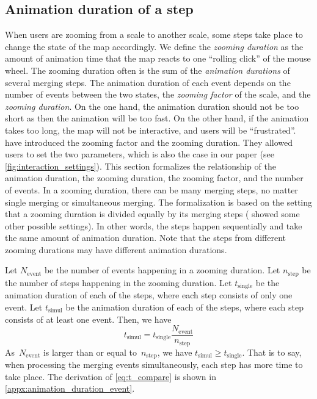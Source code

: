 \documentclass[twocolumn]{svjour3}          %
\begin{document}


\subsection{Animation duration of a step}
\label{sec:zooming_duration}

When users are zooming from a scale to another scale,
some steps take place to change the state of the map accordingly.
We define the \emph{zooming duration} as the amount of 
animation time that the map reacts to one ``rolling click'' of the mouse wheel.
The zooming duration often is the sum of 
the \emph{animation durations} of several merging steps.
The animation duration of each event depends on 
the number of events between the two states,
the \emph{zooming factor} of the scale, and 
the \emph{zooming duration}.
On the one hand, the animation duration should not be too short 
as then the animation will be too fast. 
On the other hand, if the animation takes too long, 
the map will not be interactive, and users will be ``frustrated''.
\citet[][]{Meijers2020Web} 
have introduced the zooming factor and the zooming duration.
They allowed users to set the two parameters,
which is also the case in our paper
(see \fig\ref{fig:interaction_settings}).
This section formalizes the relationship of the animation duration,
the zooming duration, the zooming factor, and the number of events.
In a zooming duration, there can be many merging steps,
no matter single merging or simultaneous merging.
The formalization is based on the setting that
a zooming duration is divided equally by its merging steps
(\citet[][]{Suba2017Thesis} showed some other possible settings).
In other words,
the steps happen sequentially and take the same amount of animation duration.
Note that the steps from different zooming durations 
may have different animation durations.

Let $N_\mathrm{event}$ be the number of events happening in a zooming duration.
Let $n_\mathrm{step}$ be the number of steps happening in the zooming duration.
Let $t_\mathrm{single}$ be the animation duration of each of the steps,
where each step consists of only one event.
Let $t_\mathrm{simul}$ be the animation duration of each of the steps,
where each step consists of at least one event.
Then, we have 
\begin{equation}
\label{eq:t_compare}
t_\mathrm{simul} = t_\mathrm{single}  \frac{N_\mathrm{event}}{n_\mathrm{step}}
\end{equation}
As~$N_\mathrm{event}$ is larger than or equal to~$n_\mathrm{step}$,
we have $t_\mathrm{simul} \ge t_\mathrm{single}$.
That is to say, when processing the merging events simultaneously,
each step has more time to take place. 
The derivation of \eq\ref{eq:t_compare} is shown 
in \appx\ref{appx:animation_duration_event}.
\end{document}
